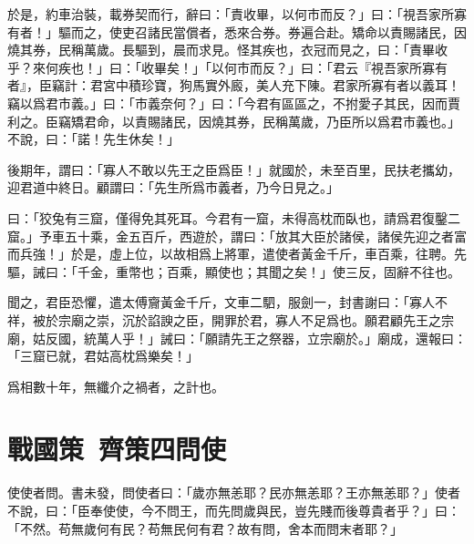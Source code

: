 於是，約車治裝，載券契而行，辭曰：「責收畢，以何市而反？」曰：「視吾家所寡有者！」驅而之，使吏召諸民當償者，悉來合券。券遍合赴。矯命以責賜諸民，因燒其券，民稱萬歲。長驅到，晨而求見。怪其疾也，衣冠而見之，曰：「責畢收乎？來何疾也！」曰：「收畢矣！」「以何市而反？」曰：「君云『視吾家所寡有者』，臣竊計：君宮中積珍寶，狗馬實外廄，美人充下陳。君家所寡有者以義耳！竊以爲君市義。」曰：「市義奈何？」曰：「今君有區區之，不拊愛子其民，因而賈利之。臣竊矯君命，以責賜諸民，因燒其券，民稱萬歲，乃臣所以爲君市義也。」不說，曰：「諾！先生休矣！」

後期年，謂曰：「寡人不敢以先王之臣爲臣！」就國於，未至百里，民扶老攜幼，迎君道中終日。顧謂曰：「先生所爲市義者，乃今日見之。」

曰：「狡兔有三窟，僅得免其死耳。今君有一窟，未得高枕而臥也，請爲君復鑿二窟。」予車五十乘，金五百斤，西遊於，謂曰：「放其大臣於諸侯，諸侯先迎之者富而兵強！」於是，虛上位，以故相爲上將軍，遣使者黃金千斤，車百乘，往聘。先驅，誡曰：「千金，重幣也；百乘，顯使也；其聞之矣！」使三反，固辭不往也。

聞之，君臣恐懼，遣太傅齎黃金千斤，文車二駟，服劍一，封書謝曰：「寡人不祥，被於宗廟之崇，沉於諂諛之臣，開罪於君，寡人不足爲也。願君顧先王之宗廟，姑反國，統萬人乎！」誡曰：「願請先王之祭器，立宗廟於。」廟成，還報曰：「三窟已就，君姑高枕爲樂矣！」

爲相數十年，無纖介之禍者，之計也。

\section[趙威后問齊使\quad{\small 戰國策\ 齊策四}]{{\normalsize 戰國策\ 齊策四}\quad {}問使}
使使者問。書未發，問使者曰：「歲亦無恙耶？民亦無恙耶？王亦無恙耶？」使者不說，曰：「臣奉使使，今不問王，而先問歲與民，豈先賤而後尊貴者乎？」曰：「不然。苟無歲何有民？苟無民何有君？故有問，舍本而問末者耶？」

